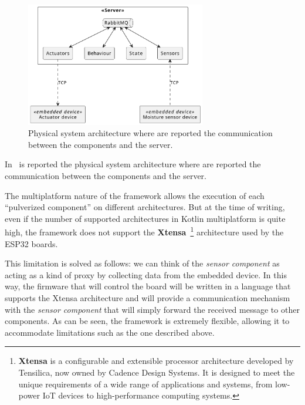 \begin{figure}
	\centering
	\includegraphics[width=0.7\textwidth]{figures/demo1-physical.pdf}
	\caption{Physical system architecture where are reported the communication between the components and the server.}
	\label{fig:demo-1-physical-system}
\end{figure}

In~ is reported the physical system architecture where are reported the communication between the components and the
server.

The multiplatform nature of the framework allows the execution of each ``pulverized component'' on different architectures.
But at the time of writing, even if the number of supported architectures in Kotlin multiplatform is quite high, the framework does not support the
\textbf{Xtensa}~\footnote{\textbf{Xtensa} is a configurable and extensible processor architecture developed by Tensilica, now owned by Cadence Design Systems. It is designed to meet the unique requirements of a wide range of applications and systems, from low-power IoT devices to high-performance computing systems.}
architecture used by the ESP32 boards.

This limitation is solved as follows: we can think of the \emph{sensor component} as acting as a kind of proxy by collecting data from
the embedded device. In this way, the firmware that will control the board will be written in a language that supports the Xtensa architecture and
will provide a communication mechanism with the \emph{sensor component} that will simply forward the received message to other components.
As can be seen, the framework is extremely flexible, allowing it to accommodate limitations such as the one described above.

